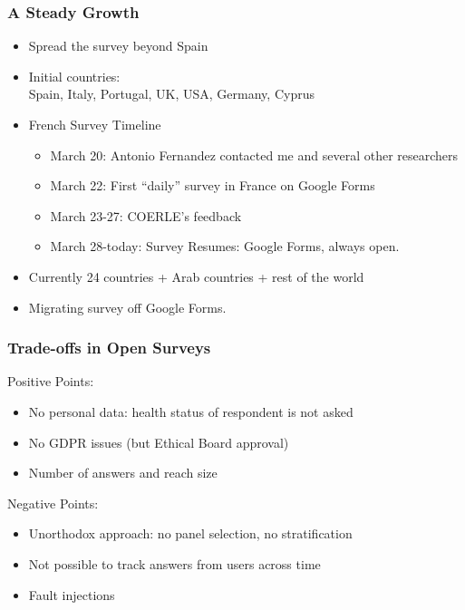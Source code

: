 \documentclass{beamer}
\begin{document}
\begin{frame}
\frametitle{A Steady Growth}
\begin{itemize}
\item Spread the survey beyond Spain 
\item Initial countries:\\
Spain, Italy, Portugal, UK, USA, Germany, Cyprus 
\item French Survey Timeline
\begin{itemize}
\item March 20: Antonio Fernandez contacted me and several other researchers
\item March 22: First ``daily'' survey in France on Google Forms
\item March 23-27: COERLE's  feedback
\item March 28-today: Survey Resumes: Google Forms, always open. 
\end{itemize}
\item Currently 24 countries + Arab countries + rest of the world
\item Migrating survey off Google Forms. 
\end{itemize}
\end{frame}




\begin{frame}
  \frametitle{Trade-offs in Open Surveys}

 Positive Points:
  \begin{itemize}
    \item No personal data: health status of respondent is not asked
    \item No GDPR issues \hfill (but Ethical Board approval)
    \item Number of answers and reach size
  \end{itemize}
 Negative Points: 
  \begin{itemize}
    \item Unorthodox approach: no panel selection, no stratification
    \item Not possible to track answers from users across time
    \item Fault injections
  \end{itemize}
\end{frame}
\end{document}

